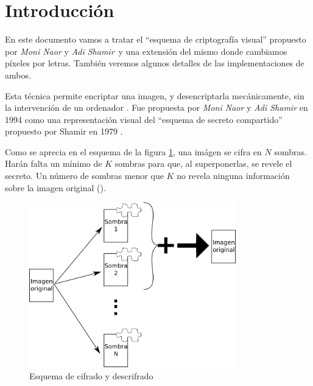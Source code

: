 \section{Introducción}
En este documento vamos a tratar el ``esquema de criptografía visual'' propuesto
por \textsl{Moni Naor} y \textsl{Adi Shamir}\cite{naor_shamir}\ y una extensión
del mismo donde cambiamos píxeles por letras\cite{articulo_base}. También
veremos algunos detalles de las implementaciones de ambos.

Esta técnica permite encriptar una imagen, y desencriptarla mecánicamente, sin
la intervención de un ordenador \cite{wikipedia}. Fue propuesta por \textsl{Moni
Naor} y \textsl{Adi Shamir} en 1994 como una representación visual del ``esquema
de secreto compartido'' propuesto por Shamir en 1979
\cite{articulo_base}\cite{articulo_esp}.

Como se aprecia en el esquema de la figura \ref{fig:esquema}, una imágen se
cifra en $N$ sombras. Harán falta un mínimo de $K$ sombras para que, al
superponerlas, se revele el secreto. Un número de sombras menor que $K$ no
revela ninguna información sobre la imagen original ().

\begin{figure}[ht]
	\centering
	\includegraphics[width=0.8\textwidth]{images/esquema}
	\caption{Esquema de cifrado y descrifrado}
	\label{fig:esquema}
\end{figure}

